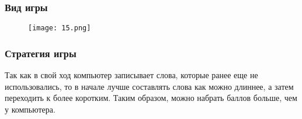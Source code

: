 \documentclass[10pt,pdf,hyperref={unicode}]{beamer}
\newcommand{\jj}{\righthyphenmin=20 \justifying}
\begin{document}
	\begin{frame}
		\frametitle{Вид игры}
		\begin{figure}[h]
			\texttt{[image: 15.png]}
		\end{figure}
	\end{frame}

	\begin{frame}
		\frametitle{Стратегия игры}
		\jj
		Так как в свой ход компьютер записывает слова, которые ранее еще не использовались, то в начале лучше составлять слова как можно длиннее, а затем переходить к более коротким. Таким образом, можно набрать баллов больше, чем у компьютера.
	\end{frame}
\end{document}
